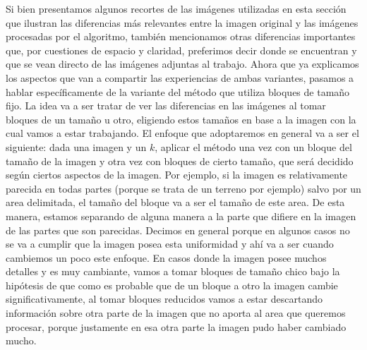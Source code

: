 \documentclass[a4paper]{article}
\begin{document}
Si bien presentamos algunos recortes de las imágenes utilizadas en esta sección que ilustran las diferencias más relevantes entre la imagen original y las imágenes procesadas por el algoritmo, también mencionamos otras diferencias importantes que, por cuestiones de espacio y claridad, preferimos decir donde se encuentran y que se vean directo de las imágenes adjuntas al trabajo.
Ahora que ya explicamos los aspectos que van a compartir las experiencias de ambas variantes, pasamos a hablar específicamente de la variante del método que utiliza bloques de tamaño fijo. La idea va a ser tratar de ver las diferencias en las imágenes al tomar bloques de un tamaño u otro, eligiendo estos tamaños en base a la imagen con la cual vamos a estar trabajando. El enfoque que adoptaremos en general va a ser el siguiente: dada una imagen y un $k$, aplicar el método una vez con un bloque del tamaño de la imagen y otra vez con bloques de cierto tamaño, que será decidido según ciertos aspectos de la imagen. Por ejemplo, si la imagen es relativamente parecida en todas partes (porque se trata de un terreno por ejemplo) salvo por un area delimitada, el tamaño del bloque va a ser el tamaño de este area. De esta manera, estamos separando de alguna manera a la parte que difiere en la imagen de las partes que son parecidas. Decimos en general porque en algunos casos no se va a cumplir que la imagen posea esta uniformidad y ahí va a ser cuando cambiemos un poco este enfoque. En casos donde la imagen posee muchos detalles y es muy cambiante, vamos a tomar bloques de tamaño chico bajo la hipótesis de que como es probable que de un bloque a otro la imagen cambie significativamente, al tomar bloques reducidos vamos a estar descartando información sobre otra parte de la imagen que no aporta al area que queremos procesar, porque justamente en esa otra parte la imagen pudo haber cambiado mucho.
\end{document}
